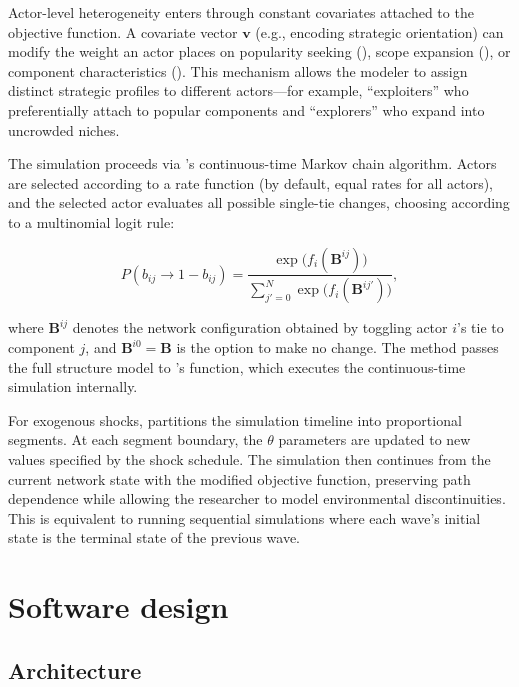 \documentclass[
  article]{jss}
\begin{document}
Actor-level heterogeneity enters through constant covariates attached to
the objective function. A covariate vector \(\mathbf{v}\) (e.g.,
encoding strategic orientation) can modify the weight an actor places on
popularity seeking (), scope expansion (), or
component characteristics (). This mechanism allows the
modeler to assign distinct strategic profiles to different actors---for
example, ``exploiters'' who preferentially attach to popular components
and ``explorers'' who expand into uncrowded niches.

The simulation proceeds via 's continuous-time Markov chain
algorithm. Actors are selected according to a rate function (by default,
equal rates for all actors), and the selected actor evaluates all
possible single-tie changes, choosing according to a multinomial logit
rule:

\begin{equation}\label{eq:choice}
  P(b_{ij} \to 1 - b_{ij}) =
  \frac{\exp\bigl(f_i(\mathbf{B}^{ij})\bigr)}
       {\sum_{j'=0}^{N} \exp\bigl(f_i(\mathbf{B}^{ij'})\bigr)},
\end{equation}

\noindent where \(\mathbf{B}^{ij}\) denotes the network configuration
obtained by toggling actor \(i\)'s tie to component \(j\), and
\(\mathbf{B}^{i0} = \mathbf{B}\) is the option to make no change. The
 method passes the full structure model to
's  function, which executes the
continuous-time simulation internally.

For exogenous shocks,  partitions the simulation timeline
into proportional segments. At each segment boundary, the \(\theta\)
parameters are updated to new values specified by the shock schedule.
The simulation then continues from the current network state with the
modified objective function, preserving path dependence while allowing
the researcher to model environmental discontinuities. This is
equivalent to running sequential  simulations where each
wave's initial state is the terminal state of the previous wave.

\section{Software design}\label{sec:package}

\subsection{Architecture}\label{sec:architecture}
\end{document}
